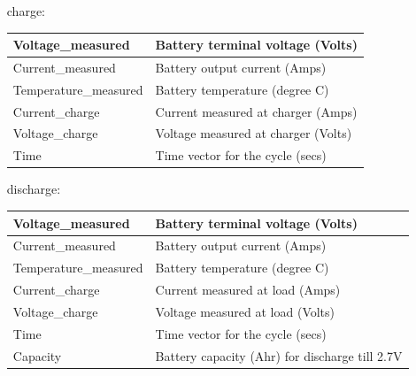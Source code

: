 \documentclass[russian,english,18pt,a4paper,reqno,dviphfm]{article}
\begin{document}
		\begin{itemize}
			\item[charge:]
				\begin{tabular}{ |l|l| }
				  \hline
						Voltage\_measured & Battery terminal voltage (Volts) \\\hline
						Current\_measured & Battery output current (Amps) \\\hline
						Temperature\_measured & Battery temperature (degree C) \\\hline
						Current\_charge & Current measured at charger (Amps) \\\hline
						Voltage\_charge & Voltage measured at charger (Volts) \\\hline
						Time & Time vector for the cycle (secs) \\
				  \hline
				\end{tabular}
			\item[discharge:]
			\begin{tabular}{ |l|l| }
			  \hline
					Voltage\_measured & Battery terminal voltage (Volts) \\\hline
					Current\_measured & Battery output current (Amps) \\\hline
					Temperature\_measured & Battery temperature (degree C) \\\hline
					Current\_charge & Current measured at load (Amps) \\\hline
					Voltage\_charge & Voltage measured at load (Volts) \\\hline
					Time & Time vector for the cycle (secs) \\\hline
					Capacity & Battery capacity (Ahr) for discharge till 2.7V \\
			  \hline
			\end{tabular}
		\end{itemize}
\newpage
\end{document}
